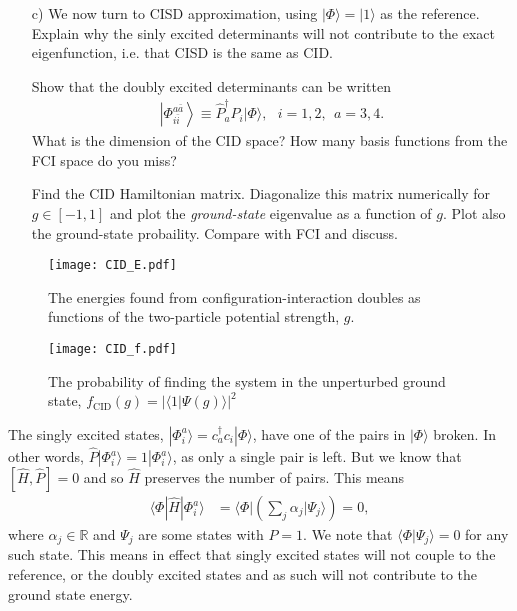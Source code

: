 \documentclass[a4paper]{article}
\newcommand{\R}{\mathbb{R}}
\begin{document}
\begin{exframe}
\begin{itemize}
  \item[c)] We now turn to CISD approximation, using $|\Phi\rangle = |1\rangle$ as the reference. Explain why the sinly excited determinants will not contribute to the exact eigenfunction, i.e. that CISD is the same as CID. 

  Show that the doubly excited determinants can be written 
  \begin{align}
  \left|\Phi_{i\bar i}^{a\bar a}\right\rangle\equiv \hat P_a^\dagger P_i |\Phi\rangle, \ \ \ i=1,2, \ \ a=3,4.
  \end{align}
  What is the dimension of the CID space? How many basis functions from the FCI space do you miss?

  Find the CID Hamiltonian matrix. Diagonalize this matrix numerically for $g\in [-1,1]$ and plot the \emph{ground-state} eigenvalue as a function of $g$. Plot also the ground-state probaility. Compare with FCI and discuss.
\end{itemize}
\end{exframe}
\begin{figure}
\centering
\texttt{[image: CID\_E.pdf]}
\caption{ The energies found from configuration-interaction doubles as functions of the two-particle potential strength, $g$. \label{fig:4}}
\end{figure}
\begin{figure}
\centering
\texttt{[image: CID\_f.pdf]}
\caption{The probability of finding the system in the unperturbed ground state, $f_\text{CID}(g)=|\langle 1|\Psi(g)\rangle|^2$\label{fig:5}}
\end{figure}
The singly excited states, $|\Phi_i^a\rangle = c^\dagger_a c_i |\Phi\rangle$, have one of the pairs in $|\Phi\rangle$ broken. In other words, $\hat P|\Phi_i^a\rangle = 1|\Phi_i^a\rangle$, as only a single pair is left. But we know that $[\hat H, \hat P]=0$ and so $\hat H$ preserves the number of pairs. This means 
\begin{align}
\langle \Phi | \hat H | \Phi_i^a\rangle &= \big\langle \Phi \big| \left( \sum_j \alpha_j \big|\Psi_j\big\rangle \right) = 0,
\end{align}
where $\alpha_j\in\R$ and $\Psi_j$ are some states with $P=1$. We note that $\langle \Phi | \Psi_j\rangle=0$ for any such state. This means in effect that singly excited states will not couple to the reference, or the doubly excited states and as such will not contribute to the ground state energy. 
\end{document}
